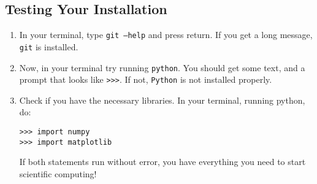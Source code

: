 \documentclass{article}
\newcommand{\git}{{\texttt{git}}}
\newcommand{\Python}{{\texttt{Python}}}
\newcommand{\python}{{\texttt{python}}}
\begin{document}
\subsection{Testing Your Installation}

\begin{enumerate}
\item In your terminal, type \texttt{git --help} and press return.  If you get a long message, \git{} is installed.
\item Now, in your terminal try running \python{}.  You should get some text, and a prompt that looks like \texttt{>>>}. If not, \Python{} is not installed properly.
\item Check if you have the necessary libraries.  In your terminal, running python, do: \begin{lstlisting}
>>> import numpy
>>> import matplotlib
\end{lstlisting}
If both statements run without error, you have everything you need to start scientific computing!
\end{enumerate}
\end{document}
